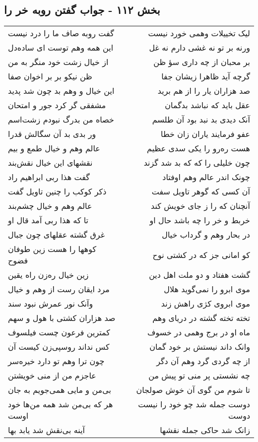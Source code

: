 \begin{center}
\section*{بخش ۱۱۲ - جواب گفتن روبه خر را}
\label{sec:sh112}
\begin{longtable}{l p{0.5cm} r}
گفت روبه صاف ما را درد نیست
&&
لیک تخییلات وهمی خورد نیست
\\
این همه وهم توست ای ساده‌دل
&&
ورنه بر تو نه غشی دارم نه غل
\\
از خیال زشت خود منگر به من
&&
بر محبان از چه داری سؤ ظن
\\
ظن نیکو بر بر اخوان صفا
&&
گرچه آید ظاهرا زیشان جفا
\\
این خیال و وهم بد چون شد پدید
&&
صد هزاران یار را از هم برید
\\
مشفقی گر کرد جور و امتحان
&&
عقل باید که نباشد بدگمان
\\
خصاه من بدرگ نبودم زشت‌اسم
&&
آنک دیدی بد نبد بود آن طلسم
\\
ور بدی بد آن سگالش قدرا
&&
عفو فرمایند یاران زان خطا
\\
عالم وهم و خیال طمع و بیم
&&
هست ره‌رو را یکی سدی عظیم
\\
نقشهای این خیال نقش‌بند
&&
چون خلیلی را که که بد شد گزند
\\
گفت هذا ربی ابراهیم راد
&&
چونک اندر عالم وهم اوفتاد
\\
ذکر کوکب را چنین تاویل گفت
&&
آن کسی که گوهر تاویل سفت
\\
عالم وهم و خیال چشم‌بند
&&
آنچنان که را ز جای خویش کند
\\
تا که هذا ربی آمد قال او
&&
خربط و خر را چه باشد حال او
\\
غرق گشته عقلهای چون جبال
&&
در بحار وهم و گرداب خیال
\\
کوهها را هست زین طوفان فضوح
&&
کو امانی جز که در کشتی نوح
\\
زین خیال ره‌زن راه یقین
&&
گشت هفتاد و دو ملت اهل دین
\\
مرد ایقان رست از وهم و خیال
&&
موی ابرو را نمی‌گوید هلال
\\
وآنک نور عمرش نبود سند
&&
موی ابروی کژی راهش زند
\\
صد هزاران کشتی با هول و سهم
&&
تخته تخته گشته در دریای وهم
\\
کمترین فرعون چست فیلسوف
&&
ماه او در برج وهمی در خسوف
\\
کس نداند روسپی‌زن کیست آن
&&
وانک داند نیستش بر خود گمان
\\
چون ترا وهم تو دارد خیره‌سر
&&
از چه گردی گرد وهم آن دگر
\\
عاجزم من از منی خویشتن
&&
چه نشستی پر منی تو پیش من
\\
بی‌من و مایی همی‌جویم به جان
&&
تا شوم من گوی آن خوش صولجان
\\
هر که بی‌من شد همه من‌ها خود اوست
&&
دوست جمله شد چو خود را نیست دوست
\\
آینه بی‌نقش شد یابد بها
&&
زانک شد حاکی جمله نقشها
\\
\end{longtable}
\end{center}
